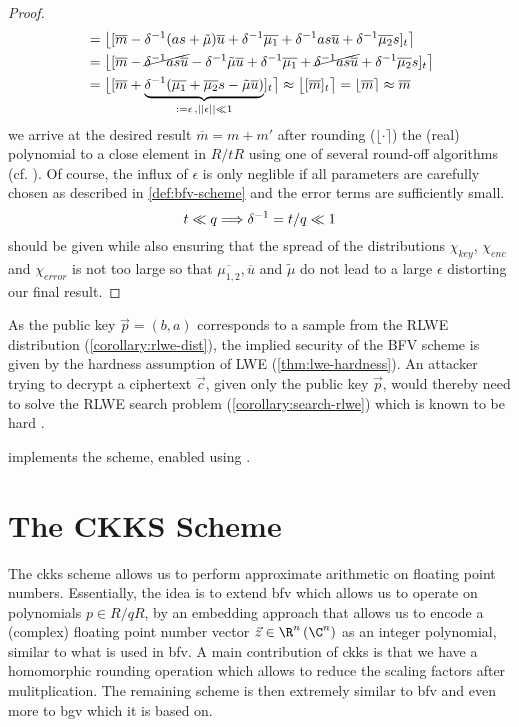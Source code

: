 \begin{proof}
\begin{align*}
     & = \big\lfloor [\overline{m} - \delta^{-1} (as + \tilde{\mu}) \overline{u} + \delta^{-1} \overline{\mu_1} + \delta^{-1} a s \overline{u} + \delta^{-1} \overline{\mu_2} s]_t \big\rceil                                        \\
     & = \big\lfloor [\overline{m} - \cancel{\delta^{-1} as \overline{u}} - \delta^{-1} \tilde{\mu} \overline{u} + \delta^{-1} \overline{\mu_1} + \cancel{\delta^{-1} as \overline{u}} + \delta^{-1} \overline{\mu_2} s]_t \big\rceil \\
     & = \big\lfloor [\overline{m} + \underbrace{\delta^{-1} (\overline{\mu_1} + \overline{\mu_2} s - \tilde{\mu} \overline{u})}_{:= \epsilon \,, ||\epsilon|| \ll 1}]_t \big\rceil
    \approx \big\lfloor [\overline{m}]_t \big\rceil = \lfloor \overline{m} \rceil \approx \overline{m}
  \end{align*}
  we arrive at the desired result $\overline{m} = m + m'$ after rounding ($\lfloor \cdot \rceil$) the (real) polynomial to a close element in $R/tR$ using one of several round-off algorithms  (cf. \cite{2013-rlwe-toolkit}).
  Of course, the influx of $\epsilon$ is only neglible if all parameters are carefully chosen as described in \cref{def:bfv-scheme} and the error terms are sufficiently small.
  $$t \ll q \Longrightarrow \delta^{-1} = t/q \ll 1$$ should be given while also ensuring that the spread of the distributions $\chi_{key}$, $\chi_{enc}$ and $\chi_{error}$ is not too large so that $\overline{\mu_{1,2}}, \overline{u}$ and $\tilde{\mu}$ do not lead to a large $\epsilon$ distorting our final result.
\end{proof}

As the public key $\vec{p} = (b, a)$ corresponds to a sample from the RLWE distribution (\cref{corollary:rlwe-dist}), the implied security of the BFV scheme is given by the hardness assumption of LWE (\cref{thm:lwe-hardness}).
An attacker trying to decrypt a ciphertext $\vec{c}$, given only the public key $\vec{p}$, would thereby need to solve the RLWE search problem (\cref{corollary:search-rlwe}) which is known to be hard \parencite{2010-rlwe-original}.

\cite{seal-4.0} implements the scheme, enabled using .

\pagebreak
\section{The CKKS Scheme}
\label{sec:ckks}
The \gls{ckks} scheme allows us to perform approximate arithmetic on floating point numbers.
Essentially, the idea is to extend \gls{bfv} which allows us to operate on polynomials $p \in R/qR$, by an embedding approach that allows us to encode a (complex) floating point number vector $\vec{z} \in \R^n\, (\C^n)$ as an integer polynomial, similar to what is used in \gls{bfv}.
A main contribution of \gls{ckks} is that we have a homomorphic rounding operation which allows to reduce the scaling factors after mulitplication.
The remaining scheme is then extremely similar to \gls{bfv} and even more to \gls{bgv} which it is based on.

